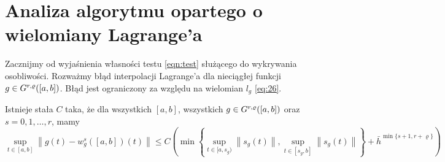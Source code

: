 \documentclass[oik, pdftex, robocza, man]{mgrwms}
\begin{document}
\section{Analiza algorytmu opartego o wielomiany Lagrange'a}


    Zacznijmy od wyjaśnienia własności testu \eqref{eqn:test} służącego do wykrywania osobliwości. Rozważmy błąd interpolacji Lagrange'a dla nieciągłej funkcji $g \in G^{r,\varrho}([a,b])$. Błąd jest ograniczony za względu na wielomian $l_{g}$ \eqref{eq:26}.

    \begin{lemma} \label{lem:1}
        Istnieje stała $C$ taka, że dla wszystkich $[a,b]$, wszystkich $g \in G^{r,\varrho}([a,b])$ oraz $s=0,1,\dots,r$, mamy
        \begin{equation*}
            \sup _{t \in[a, b]}\left\|g(t)-w_{g}^{s}([a, b])(t)\right\| \leq C\left(\min \left\{\sup_{t \in[a, s_{g})}\left\|s_{g}(t)\right\|, \sup _{t \in [s_{g}, b]}\left\|s_{g}(t)\right\|\right\}+\bar{h}^{\min \{s+1, r+\varrho\}}\right)
        \end{equation*}
    \end{lemma}
\end{document}
